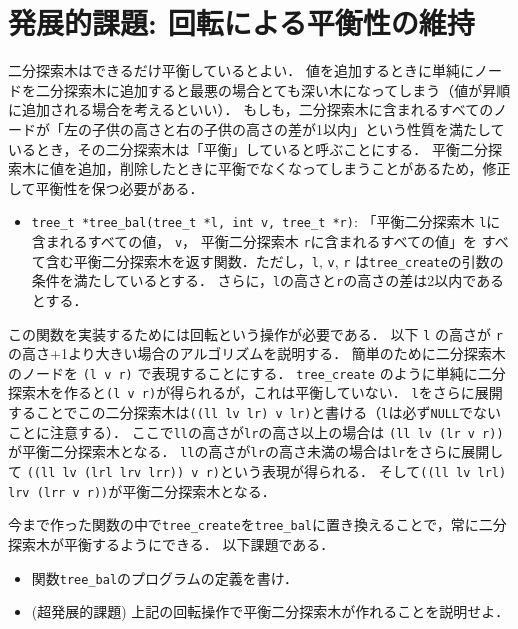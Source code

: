 \documentclass[a4paper,twoside,onecolumn,openany,article]{memoir}
\theoremstyle{remark}
\begin{document}
\section{発展的課題: 回転による平衡性の維持}
二分探索木はできるだけ平衡しているとよい．
値を追加するときに単純にノードを二分探索木に追加すると最悪の場合とても深い木になってしまう（値が昇順に追加される場合を考えるといい）．
もしも，二分探索木に含まれるすべてのノードが「左の子供の高さと右の子供の高さの差が1以内」という性質を満たしているとき，その二分探索木は「平衡」していると呼ぶことにする．
平衡二分探索木に値を追加，削除したときに平衡でなくなってしまうことがあるため，修正して平衡性を保つ必要がある．
\begin{itemize}
\item \texttt{tree\_t *tree\_bal(tree\_t *l, int v, tree\_t *r)}: 「平衡二分探索木 \texttt{l}に含まれるすべての値， \texttt{v}， 平衡二分探索木 \texttt{r}に含まれるすべての値」を
すべて含む平衡二分探索木を返す関数．ただし，\texttt{l}, \texttt{v}, \texttt{r} は\texttt{tree\_create}の引数の条件を満たしているとする．
さらに，\texttt{l}の高さと\texttt{r}の高さの差は2以内であるとする．
\end{itemize}
この関数を実装するためには回転という操作が必要である．
以下 \texttt{l} の高さが \texttt{r} の高さ+1より大きい場合のアルゴリズムを説明する．
簡単のために二分探索木のノードを \texttt{(l v r)} で表現することにする．
\texttt{tree\_create} のように単純に二分探索木を作ると\texttt{(l v r)}が得られるが，これは平衡していない．
\texttt{l}をさらに展開することでこの二分探索木は\texttt{((ll lv lr) v lr)}と書ける（\texttt{l}は必ず\texttt{NULL}でないことに注意する）．
ここで\texttt{ll}の高さが\texttt{lr}の高さ以上の場合は
\texttt{(ll lv (lr v r))}が平衡二分探索木となる．
\texttt{ll}の高さが\texttt{lr}の高さ未満の場合は\texttt{lr}をさらに展開して
\texttt{((ll lv (lrl lrv lrr)) v r)}という表現が得られる．
そして\texttt{((ll lv lrl) lrv (lrr v r))}が平衡二分探索木となる．

今まで作った関数の中で\texttt{tree\_create}を\texttt{tree\_bal}に置き換えることで，常に二分探索木が平衡するようにできる．
以下課題である．
\begin{itemize}
\item 関数\texttt{tree\_bal}のプログラムの定義を書け．
\item (超発展的課題) 上記の回転操作で平衡二分探索木が作れることを説明せよ．
\end{itemize}
\end{document}
